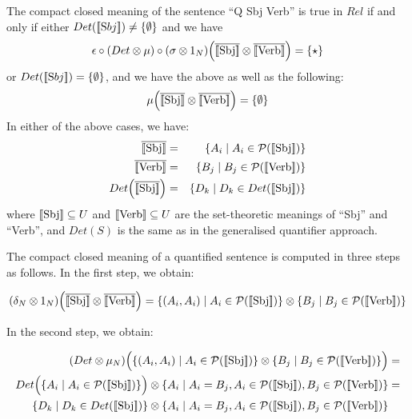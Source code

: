 \begin{definition}
\label{deftrue}
The compact closed meaning of the sentence ``Q Sbj Verb'' is true  in $Rel$ if and only if either $Det([\![ \text Sbj ]\!]) \neq \{\emptyset\}$ and we have 
\[
\epsilon \circ (Det \otimes \mu) \circ (\sigma \otimes 1_N) \Big(\overline{[\![ \text{Sbj} ]\!]} \otimes \overline{[\![ \text{Verb} ]\!]} \Big) = \{\star\} 
\] 
or  $Det([\![ \text Sbj ]\!]) = \{\emptyset\}$,  and we have the above as well as the following: 
\[
\mu \Big(\overline{[\![ \text{Sbj} ]\!]} \otimes \overline{[\![ \text{Verb} ]\!]} \Big) = \{\emptyset\}
\]
In either of the above cases, we have:
\begin{eqnarray*}
\overline{\semantics{\text{Sbj}}} &=& \{A_i \mid A_i \in {\cal P}(\semantics{\text{Sbj}})\}\\
\overline{\semantics{\text{Verb}}} &=& \{B_j \mid B_j \in {\cal P}(\semantics{\text{Verb}})\}\\
Det\Big(\overline{\semantics{\text{Sbj}}}\Big) &=& \{D_k \mid D_k \in Det(\semantics{\text{Sbj}})\}
\end{eqnarray*}
where   $[\![ \text{Sbj} ]\!] \subseteq U$ and $[\![ \text{Verb} ]\!] \subseteq U$ are the set-theoretic meanings of ``Sbj'' and ``Verb'', and $Det(S)$  is the same as in the generalised quantifier approach. 
\end{definition}

The compact closed meaning of a quantified sentence is computed in three steps as follows. In the  first step, we obtain:

\begin{align*}
(\delta_N \otimes 1_{N})\Big(\overline{\semantics{\text{Sbj}}} \otimes \overline{\semantics{\text{Verb}}}\Big) =  \{(A_i, A_i) \mid A_i \in {\cal P} (\semantics{\text{Sbj}})\} \otimes \{B_j \mid B_j \in  {\cal P} (\semantics{\text{Verb}})\}
\end{align*}


\noindent
In the second step, we obtain:

\begin{align*}
(Det \otimes  \mu_N)\Big(\{(A_i, A_i) \mid A_i \in {\cal P} (\semantics{\text{Sbj}})\} \otimes \{B_j \mid B_j \in  {\cal P} (\semantics{\text{Verb}})\}\Big) &=\\
Det\Big(\{A_i \mid A_i \in {\cal P} (\semantics{\text{Sbj}})\}\Big) \otimes \{A_i \mid A_i = B_j, A_i \in {\cal P} (\semantics{\text{Sbj}}), B_j \in  {\cal P}(\semantics{\text{Verb}})\} &=\\
\{D_k \mid D_k \in Det(\semantics{\text{Sbj}})\} \otimes \{A_i \mid A_i = B_j, A_i \in {\cal P} (\semantics{\text{Sbj}}), B_j \in  {\cal P}(\semantics{\text{Verb}})\}
\end{align*}

